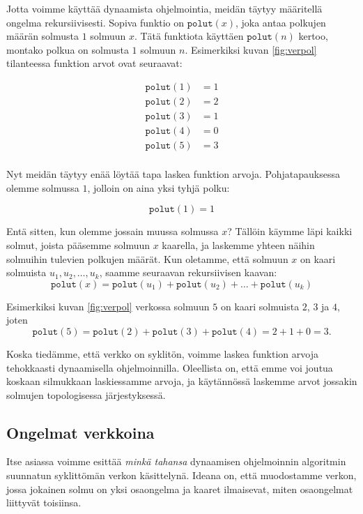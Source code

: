 Jotta voimme käyttää dynaamista ohjelmointia,
meidän täytyy määritellä ongelma rekursiivisesti.
Sopiva funktio on $\texttt{polut}(x)$,
joka antaa polkujen määrän solmusta $1$ solmuun $x$.
Tätä funktiota käyttäen $\texttt{polut}(n)$ kertoo,
montako polkua on solmusta $1$ solmuun $n$.
Esimerkiksi kuvan \ref{fig:verpol} tilanteessa
funktion arvot ovat seuraavat:

\begin{align*}
\texttt{polut}(1)&=1 \\
\texttt{polut}(2)&=2 \\
\texttt{polut}(3)&=1 \\
\texttt{polut}(4)&=0 \\
\texttt{polut}(5)&=3 \\
\end{align*}

Nyt meidän täytyy enää löytää tapa laskea
funktion arvoja.
Pohjatapauksessa olemme solmussa $1$,
jolloin on aina yksi tyhjä polku:

\[ \texttt{polut}(1)=1 \]

Entä sitten, kun olemme jossain muussa solmussa $x$?
Tällöin käymme läpi kaikki solmut, joista pääsemme
solmuun $x$ kaarella, ja laskemme yhteen näihin
solmuihin tulevien polkujen määrät.
Kun oletamme, että solmuun $x$ on kaari solmuista $u_1,u_2,\dots,u_k$,
saamme seuraavan rekursiivisen kaavan:
\[ \texttt{polut}(x)=\texttt{polut}(u_1)+\texttt{polut}(u_2)+\dots+\texttt{polut}(u_k) \]

Esimerkiksi kuvan \ref{fig:verpol} verkossa
solmuun $5$ on kaari solmuista $2$, $3$ ja $4$, joten
\[ \texttt{polut}(5)=\texttt{polut}(2)+\texttt{polut}(3)+\texttt{polut}(4) = 2+1+0 = 3.\]

Koska tiedämme, että verkko on syklitön,
voimme laskea funktion arvoja
tehokkaasti dynaamisella ohjelmoinnilla.
Oleellista on, että emme voi joutua koskaan silmukkaan
laskiessamme arvoja, ja
käytännössä laskemme arvot jossakin solmujen
topologisessa järjestyksessä.

\subsection{Ongelmat verkkoina}

Itse asiassa voimme esittää \emph{minkä tahansa}
dynaamisen ohjelmoinnin algoritmin
suunnatun syklittömän verkon käsittelynä.
Ideana on, että muodostamme verkon, jossa jokainen solmu on
yksi osaongelma ja kaaret ilmaisevat,
miten osaongelmat liittyvät toisiinsa.

